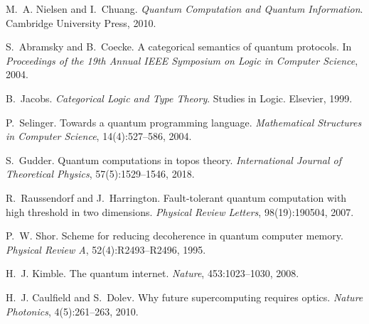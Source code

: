 \documentclass[12pt]{article}
\theoremstyle{definition}
\theoremstyle{remark}
\begin{document}

\begin{thebibliography}{10}

M.~A. Nielsen and I.~Chuang.
\newblock \emph{Quantum Computation and Quantum Information}.
\newblock Cambridge University Press, 2010.

S.~Abramsky and B.~Coecke.
\newblock A categorical semantics of quantum protocols.
\newblock In \emph{Proceedings of the 19th Annual IEEE Symposium on Logic in
  Computer Science}, 2004.

B.~Jacobs.
\newblock \emph{Categorical Logic and Type Theory}.
\newblock Studies in Logic. Elsevier, 1999.

P.~Selinger.
\newblock Towards a quantum programming language.
\newblock \emph{Mathematical Structures in Computer Science}, 14(4):527--586,
  2004.

S.~Gudder.
\newblock Quantum computations in topos theory.
\newblock \emph{International Journal of Theoretical Physics},
  57(5):1529--1546, 2018.

R.~Raussendorf and J.~Harrington.
\newblock Fault-tolerant quantum computation with high threshold in two
  dimensions.
\newblock \emph{Physical Review Letters}, 98(19):190504, 2007.

P.~W. Shor.
\newblock Scheme for reducing decoherence in quantum computer memory.
\newblock \emph{Physical Review A}, 52(4):R2493--R2496, 1995.

H.~J. Kimble.
\newblock The quantum internet.
\newblock \emph{Nature}, 453:1023--1030, 2008.

H.~J. Caulfield and S.~Dolev.
\newblock Why future supercomputing requires optics.
\newblock \emph{Nature Photonics}, 4(5):261--263, 2010.

\end{thebibliography}
\end{document}
